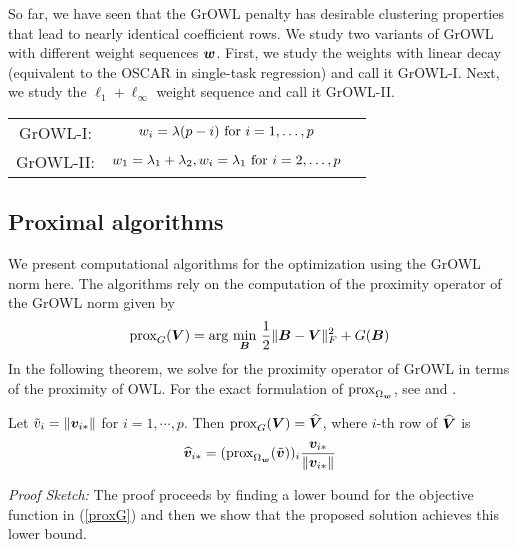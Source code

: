 So far, we have seen that the GrOWL penalty has desirable clustering properties that lead
to nearly identical coefficient rows. We study two variants of GrOWL with different weight
sequences $\boldsymbol{w}$. First, we study the weights with linear decay (equivalent to the OSCAR in
single-task regression) and call it GrOWL-I. Next, we study the $\ell_1 +\ell_{\infty}$
weight sequence and call it GrOWL-II.


    \begin{tabular}[b]{ccc}
    \hline
    	GrOWL-I:	& $w_i = \lambda (p - i) \textnormal{ for } i = 1, \dots,  p $   &\\ 
	GrOWL-II:	& $w_1 = \lambda_1 +  \lambda_2, w_i = \lambda_1 \textnormal{ for } i = 2, \dots,  p$  &\\ \hline
	    \end{tabular}


    




\subsection{Proximal algorithms}
We present computational algorithms for the optimization using the GrOWL norm here. The algorithms rely on the computation of the proximity operator \citep{prox} of the GrOWL norm given by
\begin{eqnarray}\label{proxG}
\textnormal{prox}_{G}(\bV) = \textnormal{arg} \underset{\bB}{ \textnormal{ min } } \frac{1}{2}\|\bB - \bV\|_F^2 + G(\bB)
\end{eqnarray}
In the following theorem, we solve for the proximity operator of GrOWL
in terms of the proximity of OWL. For the exact formulation of
$\textnormal{prox}_{\Omega_{\boldsymbol{w}}}$, see \citet{candes13} and \citet{ZengFigueiredo2014}.

\begin{theorem} Let $\tilde{v}_i = \| \boldsymbol{v}_{i {\ast}}\|$ for $i = 1, \cdots, p$. Then
$\textnormal{prox}_{G}(\boldsymbol{V}) = \widehat {\boldsymbol{V}}$, where $i$-th row of $\widehat {\boldsymbol{V}}$ is
\begin{eqnarray}\label{Vhat}
\widehat \bv_{i \a} =  (\textnormal{prox}_{\Omega_{\bw}}(\tilde{\bv}))_i \frac{\bv_{i\a}}{\|\bv_{i \a}\|}
\end{eqnarray}
\end{theorem}
\textit{Proof Sketch:} The proof proceeds by finding a lower bound for the objective function in (\ref{proxG}) and then we show that the proposed solution achieves this lower bound.





